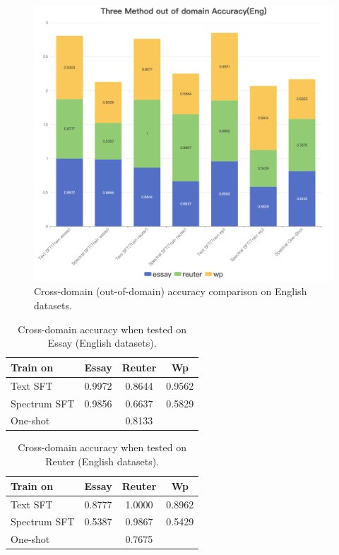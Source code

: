 \documentclass[lettersize,journal]{IEEEtran}
\begin{document}
\begin{figure}[H]
    \centering
    \includegraphics[width=0.65\linewidth]{images/Three Method out of domain Accuracy(Eng).png}
    \caption{Cross-domain (out-of-domain) accuracy comparison on English datasets.}
\end{figure}
\begin{table}[H]
\centering
\begin{tabular}{|l|c|c|c|}
\hline
Train on & Essay & Reuter & Wp \\
\hline
Text SFT     & 0.9972 & 0.8644 & 0.9562 \\
\hline
Spectrum SFT & 0.9856 & 0.6637 & 0.5829 \\
\hline
One-shot     & \multicolumn{3}{c|}{0.8133} \\
\hline
\end{tabular}
\caption{Cross-domain accuracy when tested on Essay (English datasets).}
\end{table}

\begin{table}[H]
\centering
\begin{tabular}{|l|c|c|c|}
\hline
Train on & Essay & Reuter & Wp \\
\hline
Text SFT     & 0.8777 & 1.0000 & 0.8962 \\
\hline
Spectrum SFT & 0.5387 & 0.9867 & 0.5429 \\
\hline
One-shot     & \multicolumn{3}{c|}{0.7675} \\
\hline
\end{tabular}
\caption{Cross-domain accuracy when tested on Reuter (English datasets).}
\end{table}
\end{document}
